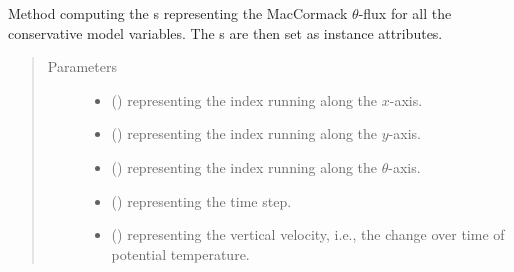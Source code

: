 \documentclass[letterpaper,10pt,english]{sphinxmanual}
\begin{document}
\begin{fulllineitems}
\begin{fulllineitems}
\begin{quote}
\begin{description}
\begin{itemize}
\end{itemize}

\end{description}\end{quote}

\end{fulllineitems}


\begin{fulllineitems}
\label{\detokenize{api:tasmania.dycore.flux_isentropic_maccormack.FluxIsentropicMacCormack._compute_vertical_fluxes}}
Method computing the s representing the MacCormack \(\theta\)-flux
for all the conservative model variables.
The s are then set as instance attributes.
\begin{quote}\begin{description}
\item[{Parameters}] \leavevmode\begin{itemize}
\item {} 
 () \textendash{}  representing the index running along the \(x\)-axis.

\item {} 
 () \textendash{}  representing the index running along the \(y\)-axis.

\item {} 
 () \textendash{}  representing the index running along the \(\theta\)-axis.

\item {} 
 () \textendash{}  representing the time step.

\item {} 
 () \textendash{}  representing the vertical velocity,
i.e., the change over time of potential temperature.


\end{itemize}
\end{description}
\end{quote}
\end{fulllineitems}
\end{fulllineitems}
\end{document}
